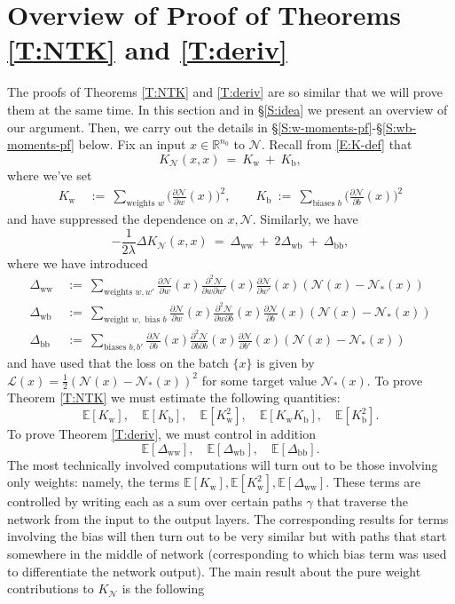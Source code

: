 \documentclass[11pt, reqno]{amsart}
\newcommand{\R}{{\mathbb R}}
\newcommand{\E}[1]{{\mathbb E}\left [#1\right]}
\newcommand{\lr}[1]{\ensuremath{\left(#1 \right)}}
\newcommand{\set}[1]{\ensuremath{\{#1\}}}
\newcommand{\mN}{\mathcal N}
\newcommand{\Kw}{K_{\mathrm{w}}}
\newcommand{\Kb}{K_{\mathrm{b}}}
\newcommand{\Dww}{\Delta_{\mathrm{ww}}}
\newcommand{\Dwb}{\Delta_{\mathrm{wb}}}
\newcommand{\Dbb}{\Delta_{\mathrm{bb}}}
\begin{document}
\section{Overview of Proof of Theorems \ref{T:NTK} and \ref{T:deriv}}\label{S:outline}
The proofs of Theorems \ref{T:NTK} and \ref{T:deriv} are so similar that we will prove them at the same time. In this section and in \S \ref{S:idea} we present an overview of our argument. Then, we carry out the details in \S \ref{S:w-moments-pf}-\S\ref{S:wb-moments-pf} below. Fix an input $x\in \R^{n_0}$ to $\mN.$ Recall from \eqref{E:K-def} that
\[K_{\mN}(x,x)~=~\Kw~+~\Kb,\]
where we've set
\begin{align}
\label{E:K-decomp}  \Kw~&:=~\sum_{\text{weights } w}
\bigg(\frac{\partial \mN}{\partial w}(x)\bigg)^2,\qquad \Kb~:=~\sum_{\text{biases }b}\bigg(\frac{\partial \mN}{\partial b}(x)\bigg)^2
\end{align}
and have suppressed the dependence on $x,\mN.$ Similarly, we have
\[-\frac{1}{2\lambda}\Delta K_{\mN}(x,x)~=~\Dww~+~2\Dwb~+~\Dbb,\]
where we have introduced 
\begin{align*}
  \Dww~&:=~\sum_{\text{weights }w,w'} \frac{\partial\mN }{\partial w}(x)\frac{\partial^2\mN }{\partial w\partial w'}(x)\frac{\partial\mN }{\partial w'}(x)\lr{\mN(x)-\mN_*(x)}\\
  \Dwb~&:=~\sum_{\text{weight }w,\text{ bias }b} \frac{\partial\mN }{\partial w}(x)\frac{\partial^2\mN }{\partial w\partial b}(x)\frac{\partial\mN }{\partial b}(x)\lr{\mN(x)-\mN_*(x)}\\
  \Dbb~&:=~\sum_{\text{biases }b,b'} \frac{\partial\mN }{\partial b}(x)\frac{\partial^2\mN }{\partial b\partial b}(x)\frac{\partial\mN }{\partial b'}(x)\lr{\mN(x)-\mN_*(x)}
\end{align*}
and have used that the loss on the batch $\set{x}$ is given by $\mathcal{L}(x)=\frac{1}{2}\lr{\mN(x)-\mN_*(x)}^2$ for some target value $\mN_*(x).$ To prove Theorem \ref{T:NTK} we must estimate the following quantities:
\[\E{\Kw},\quad\E{\Kb},\quad \E{\Kw^2},\quad \E{\Kw\Kb},\quad \E{\Kb^2}.\]
To prove Theorem \ref{T:deriv}, we must control in addition
\[\E{\Dww},\quad \E{\Dwb},\quad \E{\Dbb}.\]
The most technically involved computations will turn out to be those involving only weights: namely, the terms $\E{\Kw}, \E{\Kw^2},  \E{\Dww}.$ These terms are controlled by writing each as a sum over certain paths $\gamma$ that traverse the network from the input to the output layers. The corresponding results for terms involving the bias will then turn out to be very similar but with paths that start somewhere in the middle of network (corresponding to which bias term was used to differentiate the network output). The main result about the pure weight contributions to $K_{\mN}$ is the following 
\end{document}
